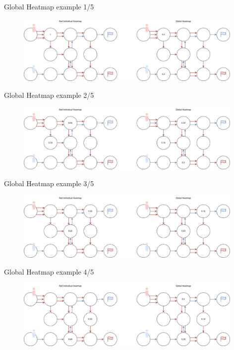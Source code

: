 \begin{frame}{Global Heatmap example 1/5}
    \begin{figure}[H]
        \centering
        \includegraphics[width=11cm]{img/global_heatmap_p1.drawio.png}
    \end{figure}
\end{frame}


\begin{frame}{Global Heatmap example 2/5}
    \begin{figure}[H]
        \centering
        \includegraphics[width=11cm]{img/global_heatmap_p2.drawio.png}
    \end{figure}
\end{frame}



\begin{frame}{Global Heatmap example 3/5}
    \begin{figure}[H]
        \centering
        \includegraphics[width=11cm]{img/global_heatmap_p3.drawio.png}
    \end{figure}
\end{frame}


\begin{frame}{Global Heatmap example 4/5}
    \begin{figure}[H]
        \centering
        \includegraphics[width=11cm]{img/global_heatmap_p4.drawio.png}
    \end{figure}
\end{frame}


